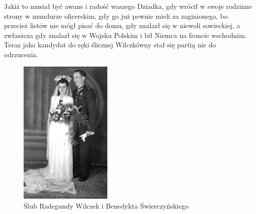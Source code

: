 Jakiż to musiał być awans i radość waszego Dziadka, gdy wrócił w swoje rodzinne strony w mundurze oficerskim, gdy go już pewnie mieli za zaginionego, bo przecież listów nie mógł pisać do domu, gdy znalazł się w niewoli sowieckiej, a zwłaszcza gdy znalazł się w Wojsku Polskim i bił Niemca na froncie wschodnim. Teraz jako kandydat do ręki ślicznej Wilczkówny stał się partią nie do odrzucenia.

\begin{figure}[!h]
\begin{center}
\includegraphics[width=0.4\textwidth]{photo/benedykt_radegunda_swierczynscy_slub.jpg}
\caption{Ślub Radegundy Wilczek i Benedykta Świerczyńskiego}
\end{center}
\end{figure}

